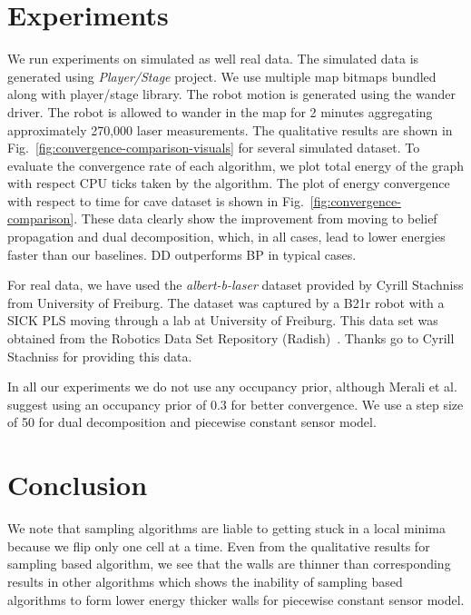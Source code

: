 \documentclass[letterpaper, 10 pt, conference]{ieeeconf} %
\begin{document}
\section{Experiments} 
We run experiments on simulated as well real data.
The simulated data is generated using \emph{Player/Stage} \cite{gerkey2003player}
project. We use multiple map bitmaps bundled along with player/stage library.
The robot motion is generated using the wander driver. The robot is allowed to
wander in the map for 2 minutes aggregating approximately 270,000 laser measurements.
The qualitative results are shown in
Fig.~\ref{fig:convergence-comparison-visuals} for several simulated dataset. To
evaluate the convergence rate of each algorithm, we plot total energy of the
graph with respect CPU ticks taken by the algorithm. The plot of energy
convergence with respect to time for cave dataset is shown in
Fig.~\ref{fig:convergence-comparison}.  These data clearly show the improvement 
from moving to belief propagation and dual decomposition, which, in all cases, 
lead to lower energies faster than our baselines.  DD outperforms BP in typical 
cases.

For real data, we have used the \emph{albert-b-laser} dataset provided by
Cyrill Stachniss from University of Freiburg. The dataset was captured by a
B21r robot with a SICK PLS moving through a lab at University of Freiburg.
This data set was obtained from the Robotics Data Set Repository
(Radish)~\cite{howard2003radish}. Thanks go to Cyrill Stachniss for providing
this data.

In all our experiments we do not use any occupancy prior, although Merali et
al. \cite{merali2013icra} suggest using an occupancy prior of 0.3 for better
convergence. We use a step size of 50 for dual decomposition and piecewise constant 
sensor model.

\section{Conclusion}
We note that sampling algorithms are liable to getting stuck in a local minima
because we flip only one cell at a time. Even from the qualitative results for
sampling based algorithm, we see that the walls are thinner than corresponding
results in other algorithms which shows the inability of sampling based
algorithms to form lower energy thicker walls for piecewise constant sensor
model.
\end{document}
